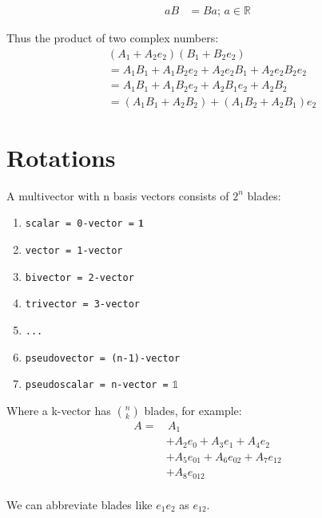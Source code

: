 \documentclass[twoside]{article}
\newcommand{\aside}[1]{\begin{flushright}\scriptsize{#1}\end{flushright}}
\begin{document}
\begin{multicols*}{2}
$$\begin{aligned}
                    aB &= Ba;\, a \in \mathbb{R}
                \end{aligned}$$
            \par
                Thus the product of two complex numbers:
                $$\begin{aligned}
                    & (A_1 + A_2 e_2)(B_1 + B_2 e_2) \\
                    & = A_1 B_1 + A_1 B_2 e_2 + A_2 e_2 B_1 + A_2 e_2 B_2 e_2 \\
                    & = A_1 B_1 + A_1 B_2 e_2 + A_2 B_1 e_2 + A_2 B_2 \\
                    & = (A_1 B_1 + A_2 B_2) + (A_1 B_2 + A_2 B_1) e_2
                \end{aligned}$$
        \section{Rotations}
            \par
                A multivector with n basis vectors consists of $ 2^n $ blades:
                \begin{enumerate}[-]
                    \item \texttt{scalar = 0-vector =} $\mathbf{1}$
                    \item \texttt{vector = 1-vector}
                    \item \texttt{bivector = 2-vector}
                    \item \texttt{trivector = 3-vector}
                    \item \texttt{...}
                    \item \texttt{pseudovector = (n-1)-vector}
                    \item \texttt{pseudoscalar = n-vector =} $\mathbb{1}$
                \end{enumerate} \vspace{5px}
                Where a k-vector has $n \choose k$ blades, for example:
                $$\begin{aligned}
                    A = & \, A_1 \\
                    &+ A_2 e_0 + A_3 e_1 + A_4 e_2 \\
                    &+ A_5 e_{01} + A_6 e_{02} + A_7 e_{12} \\
                    &+ A_8 e_{012} \\
                \end{aligned}$$
                \aside{We can abbreviate blades like $ e_1 e_2 $ as $ e_{12} $.}

\end{multicols*}
\end{document}
